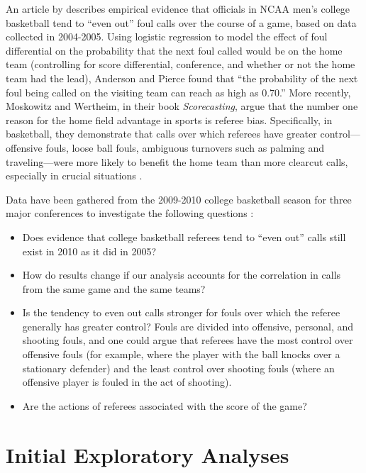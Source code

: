 \documentclass[
]{krantz}
\providecommand{\tightlist}{%
  \setlength{\itemsep}{0pt}\setlength{\parskip}{0pt}}
\begin{document}
An article by \citet{Anderson2009} describes empirical evidence that officials in NCAA men's college basketball tend to ``even out'' foul calls over the course of a game, based on data collected in 2004-2005. Using logistic regression to model the effect of foul differential on the probability that the next foul called would be on the home team (controlling for score differential, conference, and whether or not the home team had the lead), Anderson and Pierce found that ``the probability of the next foul being called on the visiting team can reach as high as 0.70.'' More recently, Moskowitz and Wertheim, in their book \emph{Scorecasting}, argue that the number one reason for the home field advantage in sports is referee bias. Specifically, in basketball, they demonstrate that calls over which referees have greater control---offensive fouls, loose ball fouls, ambiguous turnovers such as palming and traveling---were more likely to benefit the home team than more clearcut calls, especially in crucial situations \citep{Moskowitz2011}.

Data have been gathered from the 2009-2010 college basketball season for three major conferences to investigate the following questions \citep{Noecker2012}:

\begin{itemize}
\tightlist
\item
  Does evidence that college basketball referees tend to ``even out'' calls still exist in 2010 as it did in 2005?
\item
  How do results change if our analysis accounts for the correlation in calls from the same game and the same teams?
\item
  Is the tendency to even out calls stronger for fouls over which the referee generally has greater control? Fouls are divided into offensive, personal, and shooting fouls, and one could argue that referees have the most control over offensive fouls (for example, where the player with the ball knocks over a stationary defender) and the least control over shooting fouls (where an offensive player is fouled in the act of shooting).
\item
  Are the actions of referees associated with the score of the game?
\end{itemize}

\hypertarget{explore-glmm}{%
\section{Initial Exploratory Analyses}\label{explore-glmm}}
\end{document}
